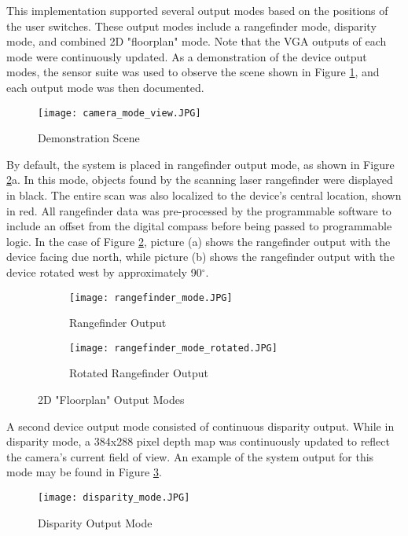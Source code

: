 \par
This implementation supported several output modes based on the positions of the user switches. These output modes include a rangefinder mode, disparity mode, and combined 2D "floorplan" mode. Note that the VGA outputs of each mode were continuously updated. As a demonstration of the device output modes, the sensor suite was used to observe the scene shown in Figure \ref{demoScene}, and each output mode was then documented.
\par
\begin{figure}[H] 
	\centerline{
	\texttt{[image: camera\_mode\_view.JPG]}
	}
	\caption{Demonstration Scene}
	\label{demoScene}
\end{figure} 
\par
By default, the system is placed in rangefinder output mode, as shown in Figure \ref{rangeOutputs}a. In this mode, objects found by the scanning laser rangefinder were displayed in black. The entire scan was also localized to the device's central location, shown in red. All rangefinder data was pre-processed by the programmable software to include an offset from the digital compass before being passed to programmable logic. In the case of Figure \ref{rangeOutputs}, picture (a) shows the rangefinder output with the device facing due north, while picture (b) shows the rangefinder output with the device rotated west by approximately 90$^\circ$.
\par
\begin{figure}[H]
\centering
        \begin{subfigure}[h]{0.8\textwidth}
             \centerline{\texttt{[image: rangefinder\_mode.JPG]}}
            \caption{Rangefinder Output}
        \end{subfigure}
        \begin{subfigure}[h]{0.8\textwidth}
            \centerline{\texttt{[image: rangefinder\_mode\_rotated.JPG]}}
            \caption{Rotated Rangefinder Output}
        \end{subfigure}
\caption{2D "Floorplan" Output Modes}
\label{rangeOutputs}
\end{figure}
\par
A second device output mode consisted of continuous disparity output. While in disparity mode, a 384x288 pixel depth map was continuously updated to reflect the camera's current field of view. An example of the system output for this mode may be found in Figure \ref{disparityOutputs}.
\begin{figure}[H]
         \centerline{\texttt{[image: disparity\_mode.JPG]}}
         \caption{Disparity Output Mode}
         \label{disparityOutputs}
\end{figure}
